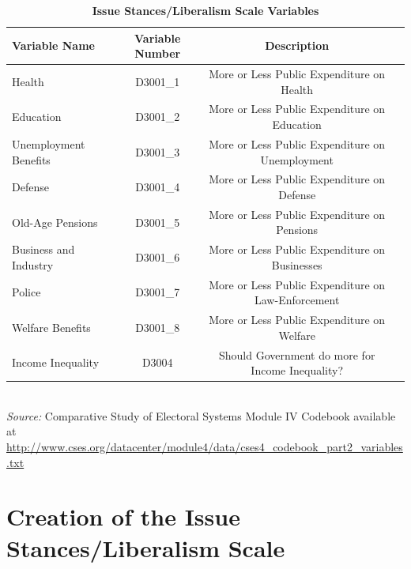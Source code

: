 \documentclass[12pt, titlepage]{article}
\newcommand\e{\emph}
\newcommand\tb{\textbf}
\begin{document}
\begin{appendices}
\begin{landscape}
\begin{table}[h!]
	\centering
	\def\arraystretch{1.5}
	\caption{\tb{Issue Stances/Liberalism Scale Variables}}
	\begin{tabulary}{\linewidth}{l c c c}
		\\
		\hline
		\tb{Variable Name}& \tb{Variable Number} & \tb{Description}\\
		\hline
		Health&D3001\_1&More or Less Public Expenditure on Health\\
		Education&D3001\_2&More or Less Public Expenditure on Education\\
		Unemployment Benefits&D3001\_3&More or Less Public Expenditure on Unemployment\\
		Defense&D3001\_4&More or Less Public Expenditure on Defense\\
		Old-Age Pensions&D3001\_5&More or Less Public Expenditure on Pensions\\
		Business and Industry&D3001\_6&More or Less Public Expenditure on Businesses\\
		Police&D3001\_7&More or Less Public Expenditure on Law-Enforcement\\
		Welfare Benefits&D3001\_8&More or Less Public Expenditure on Welfare\\
		Income Inequality&D3004&Should Government do more for Income Inequality?\\
		\hline
	\end{tabulary}\\
	\e{Source:} Comparative Study of Electoral Systems Module IV Codebook available at \url{http://www.cses.org/datacenter/module4/data/cses4_codebook_part2_variables.txt}
	\label{table100}
\end{table}

\end{landscape}
\clearpage

\section{Creation of the Issue Stances/Liberalism Scale}
\label{AppendixB}

\end{appendices}


\clearpage


\end{document}
